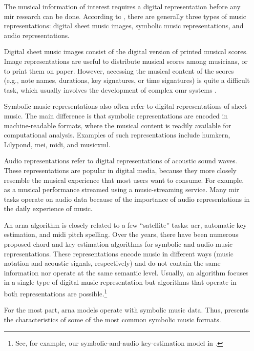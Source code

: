 


The musical information of interest requires a digital
representation before any \gls{mir} research can be done.
According to \textcite[p.~1]{muller2015music}, there are
generally three types of music representations: digital
sheet music images, symbolic music representations, and
audio representations.

Digital sheet music images consist of the digital version of
printed musical scores. Image representations are useful to
distribute musical scores among musicians, or to print them
on paper. However, accessing the musical content of the
scores (e.g., note names, durations, key signatures, or time
signatures) is quite a difficult task, which usually
involves the development of complex \gls{omr} systems
\parencite{calvozaragoza2020understanding}.

Symbolic music representations also often refer to digital
representations of sheet music. The main difference is that
symbolic representations are encoded in machine-readable
formats, where the musical content is readily available for
computational analysis. Examples of such representations
include \gls{humkern}, Lilypond, \gls{mei}, \gls{midi}, and
\gls{musicxml}.

Audio representations refer to digital representations of
acoustic sound waves. These representations are popular in
digital media, because they more closely resemble the
musical experience that most users want to consume. For
example, as a musical performance streamed using a
music-streaming service. Many \gls{mir} tasks operate on
audio data because of the importance of audio
representations in the daily experience of music.

An \gls{arna} algorithm is closely related to a few
``satellite'' tasks: \gls{acr}, automatic key estimation,
and \gls{midi} pitch spelling. Over the years, there have
been numerous proposed chord and key estimation algorithms
for symbolic and audio music representations. These
representations encode music in different ways (music
notation and acoustic signals, respectively) and do not
contain the same information nor operate at the same
semantic level. Usually, an algorithm focuses in a single
type of digital music representation but algorithms that
operate in both representations are possible.\footnote{See,
for example, our symbolic-and-audio key-estimation model in
\textcite{napoleslopez2019keyfinding}.}

For the most part, \gls{arna} models operate with symbolic
music data. Thus,  presents
the characteristics of some of the most common symbolic
music formats. 

